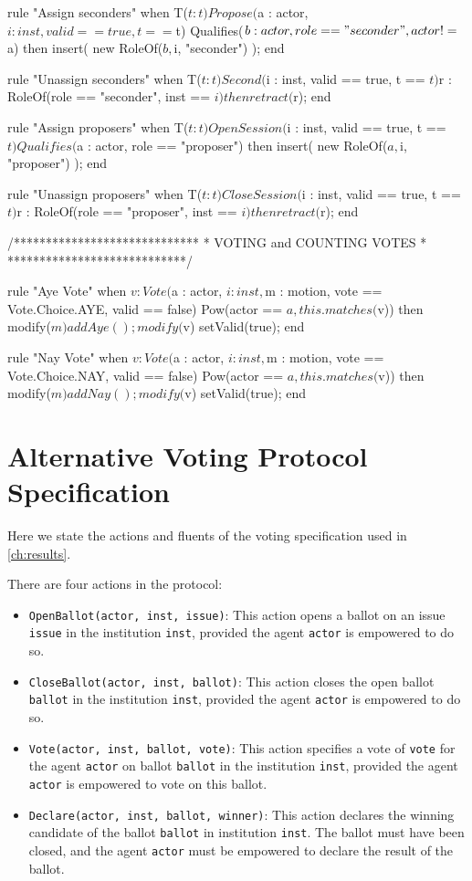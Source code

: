 \begin{droolsinline}
rule "Assign seconders"
	when
		T($t : t)
		Propose($a : actor, $i : inst, valid == true, t == $t)
		Qualifies($b : actor, role == "seconder", actor != $a)
	then
		insert( new RoleOf($b, $i, "seconder") );
end

rule "Unassign seconders"
	when
		T($t : t)
		Second($i : inst, valid == true, t == $t)
		$r : RoleOf(role == "seconder", inst == $i)
	then
		retract($r);
end

rule "Assign proposers"
	when
		T($t : t)
		OpenSession($i : inst, valid == true, t == $t)
		Qualifies($a : actor, role == "proposer")
	then
		insert( new RoleOf($a, $i, "proposer") );
end

rule "Unassign proposers"
	when
		T($t : t)
		CloseSession($i : inst, valid == true, t == $t)
		$r : RoleOf(role == "proposer", inst == $i)
	then
		retract($r);
end

/*****************************
 * VOTING and COUNTING VOTES *
 ****************************/

rule "Aye Vote"
	when
		$v : Vote($a : actor, $i : inst, $m : motion, vote == Vote.Choice.AYE, valid == false)
		Pow(actor == $a, this.matches($v))
	then
		modify($m) {
			addAye();	
		}
		modify($v) {
			setValid(true);
		}
end

rule "Nay Vote"
	when
		$v : Vote($a : actor, $i : inst, $m : motion, vote == Vote.Choice.NAY, valid == false)
		Pow(actor == $a, this.matches($v))
	then
		modify($m) {
			addNay();
		}
		modify($v) {
			setValid(true);
		}
end
\end{droolsinline}

\section{Alternative Voting Protocol Specification}\label{sec:votingspec}

Here we state the actions and fluents of the voting specification used in \autoref{ch:results}.

There are four actions in the protocol:
\begin{itemize}
\item \texttt{OpenBallot(actor, inst, issue)}: This action opens a ballot on an issue \texttt{issue} in the institution \texttt{inst}, provided the agent \texttt{actor} is empowered to do so.
\item \texttt{CloseBallot(actor, inst, ballot)}: This action closes the open ballot \texttt{ballot} in the institution \texttt{inst}, provided the agent \texttt{actor} is empowered to do so.
\item \texttt{Vote(actor, inst, ballot, vote)}: This action specifies a vote of \texttt{vote} for the agent \texttt{actor} on ballot \texttt{ballot} in the institution \texttt{inst}, provided the agent \texttt{actor} is empowered to vote on this ballot.
\item \texttt{Declare(actor, inst, ballot, winner)}: This action declares the winning candidate of the ballot \texttt{ballot} in institution \texttt{inst}. The ballot must have been closed, and the agent \texttt{actor} must be empowered to declare the result of the ballot.
\end{itemize}


